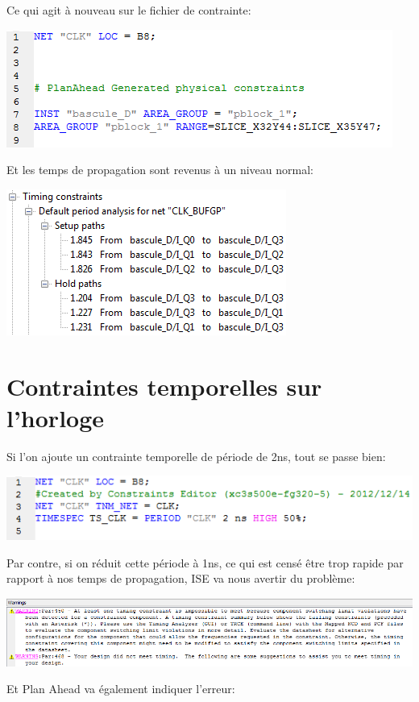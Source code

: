 \documentclass{article}
\begin{document}
Ce qui agit à nouveau sur le fichier de contrainte:

\includegraphics{plan_ahead_zone_ucf}

Et les temps de propagation sont revenus à un niveau normal:

\includegraphics{temps_de_propagation_zone}


\section{Contraintes temporelles sur l’horloge}

Si l’on ajoute un contrainte temporelle de période de 2ns, tout se passe bien:

\includegraphics{time_constraint_ucf}

Par contre, si on réduit cette période à 1ns, ce qui est censé être trop rapide par rapport à nos temps de propagation,
ISE va nous avertir du problème:

\includegraphics[width=\linewidth]{time_constraint_warning_1ns}

Et Plan Ahead va également indiquer l’erreur:
\end{document}

